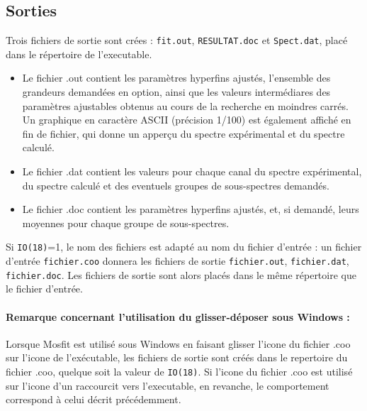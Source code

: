 \subsection{Sorties}
Trois fichiers de sortie sont crées :  \lstinline{fit.out}, \lstinline{RESULTAT.doc} et \lstinline{Spect.dat}, placé dans le répertoire de l'executable.
\begin{itemize}
\item Le fichier .out contient les paramètres hyperfins ajustés, l'ensemble des grandeurs demandées en option, ainsi que les valeurs intermédiares des paramètres ajustables obtenus au cours de la recherche en moindres carrés.
     Un graphique en caractère ASCII (précision 1/100) est également affiché en fin de fichier, qui donne un apperçu du spectre expérimental et du spectre calculé.
\item Le fichier .dat contient les valeurs pour chaque canal du spectre expérimental, du spectre calculé et des eventuels groupes de sous-spectres demandés.
\item Le fichier .doc contient les paramètres hyperfins ajustés, et, si demandé, leurs moyennes pour chaque groupe de sous-spectres. 
\end{itemize}
Si \lstinline{IO(18)}=1, le nom des fichiers est adapté au nom du fichier d'entrée : un fichier d'entrée \lstinline{fichier.coo} donnera les fichiers de sortie \lstinline{fichier.out}, \lstinline{fichier.dat}, \lstinline{fichier.doc}.
Les fichiers de sortie sont alors placés dans le même répertoire que le fichier d'entrée.

\paragraph{Remarque concernant l'utilisation du glisser-déposer sous Windows :}
Lorsque Mosfit est utilisé sous Windows en faisant glisser l'icone du fichier .coo sur l'icone de l'exécutable, les fichiers de sortie sont créés dans le repertoire du fichier .coo, quelque soit la valeur de \lstinline{IO(18)}.
Si l'icone du fichier .coo est utilisé sur l'icone d'un raccourcit vers l'executable, en revanche, le comportement correspond à celui décrit précédemment. 
